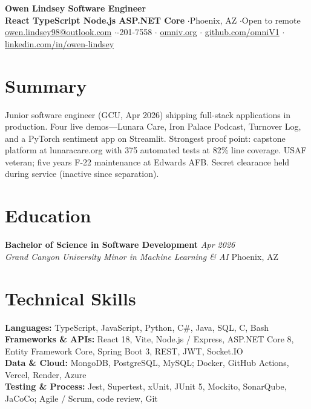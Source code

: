 \documentclass[10pt,letterpaper]{article}
\newcommand{\resumeHeading}[4]{
  \vspace{0pt}
  \textbf{#1} \hfill \textit{#2} \\
  \textit{#3} \hfill #4
}
\begin{document}
\begin{center}
  {\Large\textbf{Owen Lindsey \textbar{} Software Engineer}} \\[2pt]
  \textbf{React \textbar{} TypeScript \textbar{} Node.js \textbar{} ASP.NET Core} \enspace$\cdot$\enspace Phoenix, AZ \enspace$\cdot$\enspace Open to remote \\[2pt]
  \href{mailto:owen.lindsey98@outlook.com}{owen.lindsey98@outlook.com} \enspace$\cdot$-201-7558 \enspace$\cdot$\enspace
  \href{https://www.omniv.org}{omniv.org} \enspace$\cdot$\enspace
  \href{https://github.com/omniV1}{github.com/omniV1} \enspace$\cdot$\enspace
  \href{https://www.linkedin.com/in/owen-lindsey-5b323a23b/}{linkedin.com/in/owen-lindsey}
\end{center}
\vspace{-0.95em}

\section{Summary}
Junior software engineer (GCU, Apr 2026) shipping full-stack applications in production. Four live demos---Lunara Care, Iron Palace Podcast, Turnover Log, and a PyTorch sentiment app on Streamlit. Strongest proof point: capstone platform at lunaracare.org with 375 automated tests at 82\% line coverage. USAF veteran; five years F-22 maintenance at Edwards AFB. Secret clearance held during service (inactive since separation).

\section{Education}
\resumeHeading{Bachelor of Science in Software Development}{Apr 2026}{Grand Canyon University \textbar{} Minor in Machine Learning \& AI}{Phoenix, AZ}

\section{Technical Skills}
\textbf{Languages:} TypeScript, JavaScript, Python, C\#, Java, SQL, C, Bash \\
\textbf{Frameworks \& APIs:} React 18, Vite, Node.js / Express, ASP.NET Core 8, Entity Framework Core, Spring Boot 3, REST, JWT, Socket.IO \\
\textbf{Data \& Cloud:} MongoDB, PostgreSQL, MySQL; Docker, GitHub Actions, Vercel, Render, Azure \\
\textbf{Testing \& Process:} Jest, Supertest, xUnit, JUnit 5, Mockito, SonarQube, JaCoCo; Agile / Scrum, code review, Git
\end{document}
